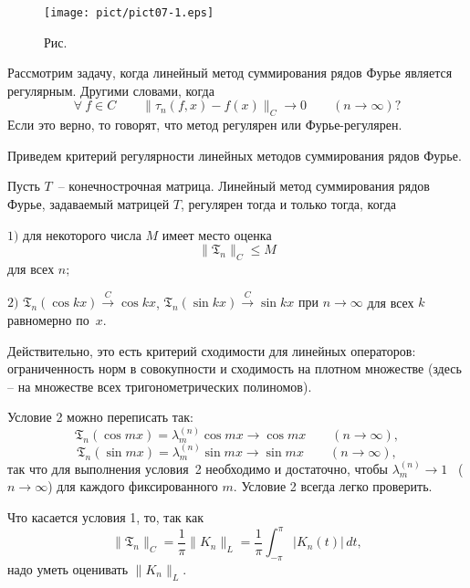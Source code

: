 
\begin{figure}[ht]
\begin{center}
\texttt{[image: pict/pict07-1.eps]}
\end{center}
 \bigskip
 \label{r7-1}

 \centerline{Рис.~\theris}
 \bigskip
\end{figure}




{Рассмотрим задачу, когда линейный метод суммирования рядов Фурье является} {регулярным.}
Другими словами, когда
$$
\forall\ f\in C\qquad \|\tau_n(f,x)-f(x)\|_C\to 0\qquad (n\to
\infty)?
$$
Если это верно, то говорят, что метод регулярен или Фурье-регулярен.

Приведем критерий регулярности линейных методов суммирования рядов Фурье.

\begin{teo}
Пусть $T$~-- конечнострочная матрица. Линейный метод суммирования рядов Фурье,
задаваемый матрицей $T$, регулярен тогда и только тогда, когда

$1)$ для некоторого числа $M$ имеет место оценка
$$
\|{\mathfrak{T}}_n\|_C\le M
$$
для всех $n;$

$2)$ ${\mathfrak{T}}_n(\cos kx)\stackrel{C}{\longrightarrow} \cos kx$,
${\mathfrak{T}}_n (\sin kx)
\stackrel{C}{\longrightarrow} \sin kx$ {при $n\to \infty$} для
всех $k$ равномерно по~$x.$
\end{teo}

Действительно, это есть критерий сходимости для линейных операторов: ограниченность
норм в совокупности и сходимость на плотном множестве
(здесь -- на множестве всех тригонометрических полиномов).

Условие 2 можно переписать так:
$$
{\mathfrak{T}}_n(\cos mx) = \lambda_m^{(n)} \cos mx \to \cos
mx\qquad (n\to \infty),
$$
$$
{\mathfrak{T}}_n(\sin mx) = \lambda_m^{(n)} \sin mx \to \sin mx \qquad (n\to \infty),
$$
так что для выполнения условия~2 необходимо и достаточно, чтобы $\lambda_m^{(n)}\to 1$~
($n\to \infty$) для каждого фиксированного $m$. Условие
2 всегда легко проверить.

Что касается условия 1, то, так как
$$
\|{\mathfrak{T}}_n\|_C=\frac{1}{\pi} \|K_n\|_L=
\frac{1}{\pi} \int_{-\pi}^{\pi} |K_n(t)|\, dt,
$$
надо уметь оценивать $\|K_n\|_L$.

